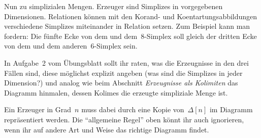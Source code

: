 \documentclass{uebblatt}
\begin{document}
Nun zu simplizialen Mengen. Erzeuger sind Simplizes in vorgegebenen
Dimensionen. Relationen können mit den Korand- und Koentartungsabbildungen
verschiedene Simplizes miteinander in Relation setzen. Zum Beispiel kann man
fordern: Die fünfte Ecke von dem und dem~8-Simplex soll gleich der dritten Ecke
von dem und dem anderen~6-Simplex sein.

In Aufgabe~2 vom Übungsblatt sollt ihr raten, was die Erzeugnisse in den drei
Fällen sind, diese möglichst explizit angeben (was sind die Simplizes in jeder
Dimension?) und analog wie beim Abschnitt \emph{Erzeugnisse als Kolimiten} das
Diagramm hinmalen, dessen Kolimes die erzeugte simpliziale Menge ist.

Ein Erzeuger in Grad~$n$ muss dabei durch eine Kopie von~$\Delta[n]$ im
Diagramm repräsentiert werden. Die "`allgemeine Regel"' oben könnt ihr auch
ignorieren, wenn ihr auf andere Art und Weise das richtige Diagramm findet.
\end{document}
